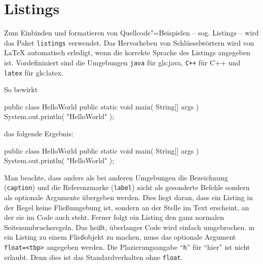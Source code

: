 \section{Listings}%
\label{sec:Listings}
%
Zum Einbinden und formatieren von Quellcode"=Beispielen
-- sog. Listings -- wird das Paket \texttt{listings}
\parencite{Hoffmann2014} verwendet.
Das Hervorheben von Schlüsselwörtern
wird von LaTeX automatisch erledigt,
wenn die korrekte Sprache des Listings angegeben ist.
Vordefininiert sind die Umgebungen \texttt{java} für \gls{gls:java},
\texttt{C++} für C++ und \texttt{latex} für \gls{gls:latex}.

So bewirkt
%
\begin{latex}[%
  caption={Listing-Beispiel},%
  label={lst:listing}]
\begin{java}[caption={A Java Hello-World example},label={lst:hello-world}]
public class HelloWorld {
  public static void main( String[] args ) {
    System.out.println( "HelloWorld" );
  }
}
\end{java}
\end{latex}
%
das folgende Ergebnis:
%
\begin{java}[caption={A Java Hello-World example},label={lst:hello-world}]
public class HelloWorld {
  public static void main( String[] args ) {
    System.out.println( "HelloWorld" );
  }
}
\end{java}

Man beachte, dass anders als bei anderen Umgebungen
die Bezeichnung (\texttt{caption}) und die Referenzmarke (\texttt{label})
nicht als gesonderte Befehle sondern als optionale Argumente übergeben werden.
Dies liegt daran, dass ein Listing in der Regel keine Fließumgebung ist,
sondern an der Stelle im Text erscheint, an der sie im Code auch steht.
Ferner folgt ein Listing den ganz normalen Seitenumbruchsregeln.
Das heißt, überlanger Code wird einfach umgebrochen. 
m ein Listing zu einem Fließobjekt zu machen, muss das optionale Argument
\texttt{float=<tbp>} angegeben werden.
Die Plazierungsangabe \enquote{\texttt{h}} für \enquote{hier}
ist nicht erlaubt. Denn dies ist das Standardverhalten ohne \texttt{float}.
